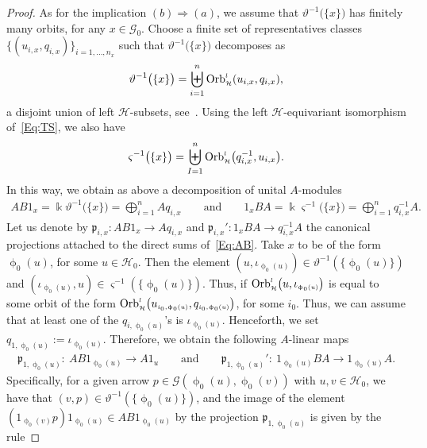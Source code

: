 \documentclass[pdftex]{sigma}
\numberwithin{equation}{section}
\newcommand{\fk}[1]{\mathfrak{#1}}
\newcommand{\Go}{\cG_{\Sscript{0}}}
\newcommand{\Ho}{\cH_{\Sscript{0}}}
\newcommand{\Orbit}[2]{{{\rm Orb}}_{\Sscript{\mathcal{#2}}}^{\Sscript{l}}\big(
#1 \big)}
\newcommand{\cG}{{\mathcal G}}
\newcommand{\cH}{{\mathcal H}}
\newcommand{\Sscript}[1]{\scriptscriptstyle{#1}}
\newcommand{\phio}{\upphi_{\Sscript{0}}}
\begin{document}
\begin{proof}
As for the implication $(b) \Rightarrow (a)$, we assume that $\vartheta^{-1}\big( \{x\}\big)$ has finitely many orbits, for any $x \in \Go$. Choose a finite set of representatives classes
$\{(u_{\Sscript{i, x}}, q_{\Sscript{i, x}})\}_{\Sscript{i=1,\dots, n_{x}}}$ such that $\vartheta^{-1}\big( \{x\}\big)$ decomposes as
\begin{gather*}
\vartheta^{-1}\big( \{x\}\big)= \biguplus_{i=1}^{n}{\rm Orb}_{\Sscript{\cH}}^{\Sscript{l}}(u_{i, x},q_{i, x}),
\end{gather*}
a disjoint union of left $\cH$-subsets, see~\cite{Kaoutit/Spinosa:2018}. Using the left $\cH$-equivariant isomorphism of~\eqref{Eq:TS}, we also have
\begin{gather*}
\varsigma^{-1}\big( \{x\}\big) = \biguplus_{I=1}^{n} {\rm Orb}_{\Sscript{\cH}}^{\Sscript{l}}\big(q_{i, x}^{-1}, u_{i, x}\big).
\end{gather*}
In this way, we obtain as above a decomposition of unital $A$-modules
\begin{gather}\label{Eq:AB}
AB1_{\Sscript{x}}=\Bbbk \vartheta^{-1}\big( \{x\}\big) = \bigoplus_{i=1}^{n} A q_{i, x}\qquad \text{and}\qquad 1_{\Sscript{x}}BA= \Bbbk \varsigma^{-1}\big( \{x\}\big) =\bigoplus_{i=1}^{n} q_{i, x}^{-1} A.
\end{gather}
Let us denote by $\fk{p}_{\Sscript{i, x}}\colon AB1_{\Sscript{x}} \to Aq_{\Sscript{i, x}}$ and $\fk{p}_{\Sscript{i, x}}'\colon 1_{\Sscript{x}}BA \to q_{\Sscript{i, x}}^{-1}A$ the canonical projections attached to the direct sums of~\eqref{Eq:AB}. Take $x$ to be of the form $\phio(u)$, for some $u \in \Ho$. Then the element $(u, \iota_{\Sscript{\phio(u)}}) \in \vartheta^{-1}(\{\phio(u)\})$ and $(\iota_{\Sscript{\phio(u)}}, u) \in \varsigma^{-1}(\{\phio(u)\})$. Thus, if $\Orbit{u, \iota_{\Sscript{\phio(u)}}}{H}$ is equal to some orbit of the form $\Orbit{u_{\Sscript{i_0, \phio(u)}}, q_{\Sscript{i_0, \phio(u)}}}{H}$, for some $i_0$. Thus, we can assume that at least one of the $q_{\Sscript{i, \phio(u)}}$'s is $\iota_{\Sscript{\phio(u)}}$. Henceforth, we set $q_{\Sscript{1, \phio(u)}} :=\iota_{\Sscript{\phio(u)}}$. Therefore, we obtain the following $A$-linear maps
\begin{gather*}
\fk{p}_{\Sscript{1, \phio(u)}}\colon \ AB1_{\Sscript{\phio(u)}} \to A 1_{\Sscript{u}}\qquad \text{and} \qquad \fk{p}_{\Sscript{1, \phio(u)}}'\colon \ 1_{\Sscript{\phio(u)}}BA \to 1_{\Sscript{\phio(u)}}A.
\end{gather*}
Specifically, for a given arrow $p \in\cG(\phio(u), \phio(v))$ with $u,v \in \Ho$, we have that $(v,p) \in \vartheta^{-1}(\{\phio(u)\})$, and the image of the element $ (1_{\Sscript{\phio(v)}} p) 1_{\Sscript{\phio(u)}} \in AB 1_{\Sscript{\phio(u)}}$ by the projection $\fk{p}_{\Sscript{1, \phio(u)}}$ is given by the rule

\end{proof}
\end{document}
